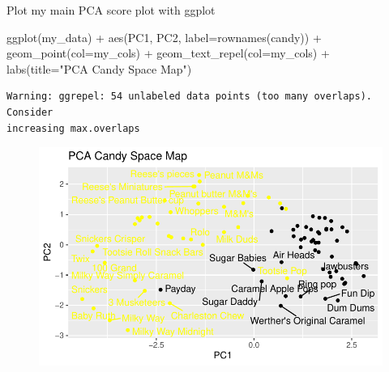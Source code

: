\documentclass[
  letterpaper,
  DIV=11,
  numbers=noendperiod]{scrartcl}
\newenvironment{Shaded}{\begin{snugshade}}{\end{snugshade}}
\newcommand{\AttributeTok}[1]{\textcolor[rgb]{0.40,0.45,0.13}{#1}}
\newcommand{\CommentTok}[1]{\textcolor[rgb]{0.37,0.37,0.37}{#1}}
\newcommand{\DecValTok}[1]{\textcolor[rgb]{0.68,0.00,0.00}{#1}}
\newcommand{\FunctionTok}[1]{\textcolor[rgb]{0.28,0.35,0.67}{#1}}
\newcommand{\NormalTok}[1]{\textcolor[rgb]{0.00,0.23,0.31}{#1}}
\newcommand{\OtherTok}[1]{\textcolor[rgb]{0.00,0.23,0.31}{#1}}
\newcommand{\SpecialCharTok}[1]{\textcolor[rgb]{0.37,0.37,0.37}{#1}}
\newcommand{\StringTok}[1]{\textcolor[rgb]{0.13,0.47,0.30}{#1}}
\begin{document}
Plot my main PCA score plot with ggplot

\begin{Shaded}
\end{Shaded}

\begin{Shaded}
\begin{Highlighting}[]
\FunctionTok{ggplot}\NormalTok{(my\_data) }\SpecialCharTok{+}
  \FunctionTok{aes}\NormalTok{(PC1, PC2, }\AttributeTok{label=}\FunctionTok{rownames}\NormalTok{(candy)) }\SpecialCharTok{+} 
  \FunctionTok{geom\_point}\NormalTok{(}\AttributeTok{col=}\NormalTok{my\_cols) }\SpecialCharTok{+}
  \FunctionTok{geom\_text\_repel}\NormalTok{(}\AttributeTok{col=}\NormalTok{my\_cols) }\SpecialCharTok{+} 
  \FunctionTok{labs}\NormalTok{(}\AttributeTok{title=}\StringTok{"PCA Candy Space Map"}\NormalTok{)}
\end{Highlighting}
\end{Shaded}

\begin{verbatim}
Warning: ggrepel: 54 unlabeled data points (too many overlaps). Consider
increasing max.overlaps
\end{verbatim}

\begin{figure}[H]

{\centering \includegraphics{Class-9_files/figure-pdf/unnamed-chunk-29-1.pdf}

}

\end{figure}
\end{document}
